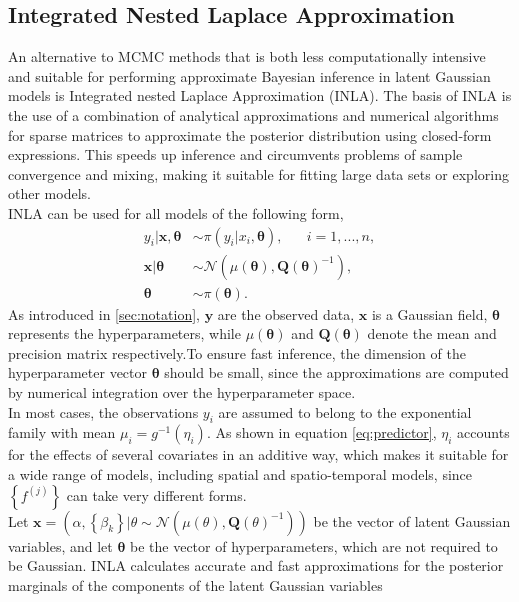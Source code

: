 \documentclass[12pt]{book}
\begin{document}
\subsection{Integrated Nested Laplace Approximation}
An alternative to MCMC methods that is both less computationally intensive and suitable for performing approximate Bayesian inference in latent Gaussian models is Integrated nested Laplace Approximation (INLA). The basis of INLA is the use of a combination of analytical approximations and numerical algorithms for sparse matrices to approximate the posterior distribution using closed-form expressions. This speeds up inference and circumvents problems of sample convergence and mixing, making it suitable for fitting large data sets or exploring other models.  \\
INLA can be used for all models of the following form,
\begin{align*}
    y_i|\pmb{x},\pmb{\theta} &\sim \pi\left(y_i|x_i,\pmb{\theta}\right), \hspace{20pt} i=1,...,n,\\
    \pmb{x}|\pmb{\theta} &\sim \mathcal{N}\left(\mu\left(\pmb{\theta}\right), \pmb{Q}\left(\pmb{\theta}\right)^{-1}\right), \\
    \pmb{\theta} &\sim \pi\left(\pmb{\theta}\right).
\end{align*}
As introduced in \autoref{sec:notation}, $\pmb{y}$ are the observed data, $\pmb{x}$ is a Gaussian field, $\pmb{\theta}$ represents the hyperparameters, while $\mu\left(\pmb{\theta}\right)$ and $\pmb{Q}\left(\pmb{\theta}\right)$ denote the mean and precision matrix respectively.To ensure fast inference, the dimension of the hyperparameter vector $\pmb{\theta}$ should be small, since the approximations are computed by numerical integration over the hyperparameter space. \\
In most cases, the observations $y_i$ are assumed to belong to the exponential family with mean $\mu_i=g^{-1}\left(\eta_i\right)$. As shown in equation \eqref{eq:predictor}, $\eta_i$ accounts for the effects of several covariates in an additive way, which makes it suitable for a wide range of models, including spatial and spatio-temporal models, since $\left\lbrace f^{(j)}\right\rbrace$ can take very different forms. \\
Let $\pmb{x}=\left(\alpha,\left\lbrace\beta_k\right\rbrace|\theta\sim\mathcal{N}\left(\mu\left(\theta\right), \pmb{Q}\left(\theta\right)^{-1}\right)\right)$ be the vector of latent Gaussian variables, and let $\pmb{\theta}$ be the vector of hyperparameters, which are not required to be Gaussian. INLA calculates accurate and fast approximations for the posterior marginals of the components of the latent Gaussian variables
\end{document}
